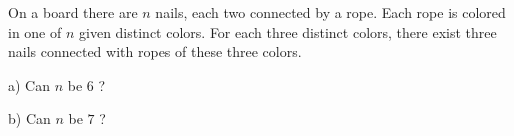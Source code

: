 On a board there are $n$ nails, each two connected by a rope. Each rope is colored in one of $n$ given distinct colors. For each three distinct colors, there exist three nails connected with ropes of these three colors.

a) Can $n$ be $6$ ?

b) Can $n$ be $7$ ?